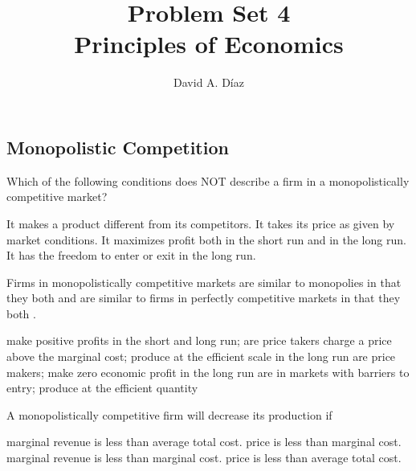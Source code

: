 \documentclass[addpoints,11pt]{exam}
\theoremstyle{definition}
\newcommand{\dd}[1]{}
\newcommand{\blank}[0]{\underline{\hspace{3cm}}}
\begin{document}
	\title{\textbf{Problem Set 4 \dd{Answers and Selected Solutions}} \\ \vspace{2 mm} {\large Principles of Economics}}
	\author{David A. D\'iaz}
	\date{}
	\maketitle

\subsection*{Monopolistic Competition}

\begin{questions}
	
	
	\question Which of the following conditions does NOT describe a firm in a monopolistically competitive market?
	
	\begin{choices}
		\choice It makes a product different from its competitors.
		\CorrectChoice It takes its price as given by market conditions.
		\choice It maximizes profit both in the short run and in the long run.
		\choice It has the freedom to enter or exit in the long run.
	\end{choices}
	

	\question Firms in monopolistically competitive markets are similar to monopolies in that they both \blank and are similar to firms in perfectly competitive markets in that they both \blank.
	
	\begin{choices}
		\choice make positive profits in the short and long run; are price takers
		\choice charge a price above the marginal cost; produce at the efficient scale in the long run
		\CorrectChoice are price makers; make zero economic profit in the long run
		\choice are in markets with barriers to entry; produce at the efficient quantity
	\end{choices}
	

	
	\question A monopolistically competitive firm will decrease its production if
	
	\begin{choices}
		\choice marginal revenue is less than average total cost.
		\choice price is less than marginal cost.
		\CorrectChoice marginal revenue is less than marginal cost.
		\choice price is less than average total cost.
	\end{choices}
		

\end{questions}
\end{document}
